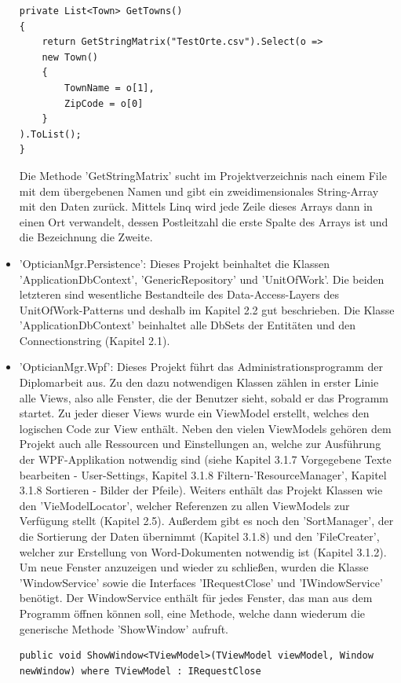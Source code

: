 \begin{itemize}
\begin{lstlisting} 
private List<Town> GetTowns()
{
	return GetStringMatrix("TestOrte.csv").Select(o =>
	new Town()
	{
		TownName = o[1],
		ZipCode = o[0]
	}
).ToList();
}\end{lstlisting} Die Methode 'GetStringMatrix' sucht im Projektverzeichnis nach einem File mit dem übergebenen Namen und gibt ein zweidimensionales String-Array mit den Daten zurück. Mittels Linq wird jede Zeile dieses Arrays dann in einen Ort verwandelt, dessen Postleitzahl die erste Spalte des Arrays ist und die Bezeichnung die Zweite.
\item 'OpticianMgr.Persistence': Dieses Projekt beinhaltet die Klassen 'ApplicationDbContext', 'GenericRepository' und 'UnitOfWork'. Die beiden letzteren sind wesentliche Bestandteile des Data-Access-Layers des UnitOfWork-Patterns und deshalb im Kapitel 2.2 gut beschrieben. Die Klasse 'ApplicationDbContext' beinhaltet alle DbSets der Entitäten und den Connectionstring (Kapitel 2.1).
\item 'OpticianMgr.Wpf': Dieses Projekt führt das Administrationsprogramm der Diplomarbeit aus. Zu den dazu notwendigen Klassen zählen in erster Linie alle Views, also alle Fenster, die der Benutzer sieht, sobald er das Programm startet. Zu jeder dieser Views wurde ein ViewModel erstellt, welches den logischen Code zur View enthält. Neben den vielen ViewModels gehören dem Projekt auch alle Ressourcen und Einstellungen an, welche zur Ausführung der WPF-Applikation notwendig sind (siehe Kapitel 3.1.7 Vorgegebene Texte bearbeiten - User-Settings, Kapitel 3.1.8 Filtern-'ResourceManager', Kapitel 3.1.8 Sortieren - Bilder der Pfeile). \newline Weiters enthält das Projekt Klassen wie den 'VieModelLocator', welcher Referenzen zu allen ViewModels zur Verfügung stellt (Kapitel 2.5).  Außerdem gibt es noch den 'SortManager', der die Sortierung der Daten übernimmt (Kapitel 3.1.8) und den 'FileCreater', welcher zur Erstellung von Word-Dokumenten notwendig ist (Kapitel 3.1.2). \newline Um neue Fenster anzuzeigen und wieder zu schließen, wurden die Klasse 'WindowService' sowie die Interfaces 'IRequestClose' und 'IWindowService' benötigt. Der WindowService enthält für jedes Fenster, das man aus dem Programm öffnen können soll, eine Methode, welche dann wiederum die generische Methode 'ShowWindow' aufruft.
\begin{lstlisting}
public void ShowWindow<TViewModel>(TViewModel viewModel, Window newWindow) where TViewModel : IRequestClose

\end{lstlisting}
\end{itemize}
